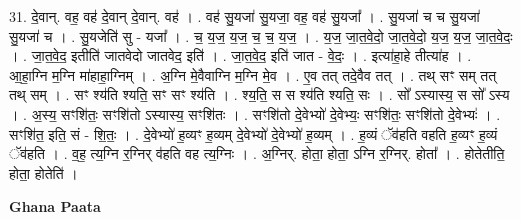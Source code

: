 \documentclass[17pt]{extarticle}
\begin{document}
31. दे॒वान्. वह॒ वह॑ दे॒वान् दे॒वान्. वह॑ । . वह॑ सु॒यजा॑ सु॒यजा॒ वह॒ वह॑ सु॒यजा᳚ । . सु॒यजा॑ च च सु॒यजा॑ सु॒यजा॑ च । . सु॒यजेति॑ सु - यजा᳚ । . च॒ य॒ज॒ य॒ज॒ च॒ च॒ य॒ज॒ । . य॒ज॒ जा॒त॒वे॒दो॒ जा॒त॒वे॒दो॒ य॒ज॒ य॒ज॒ जा॒त॒वे॒दः॒ । . जा॒त॒वे॒द॒ इतीति॑ जातवेदो जातवेद॒ इति॑ । . जा॒त॒वे॒द॒ इति॑ जात - वे॒दः॒ । . इत्या॑हा॒हे तीत्या॑ह । . आ॒हा॒ग्नि म॒ग्नि मा॑हाहा॒ग्निम् । . अ॒ग्नि मे॒वैवाग्नि म॒ग्नि मे॒व । . ए॒व तत् तदे॒वैव तत् । . तथ् सꣳ सम् तत् तथ् सम् । . सꣳ श्य॑ति श्यति॒ सꣳ सꣳ श्य॑ति । . श्य॒ति॒ स स श्य॑ति श्यति॒ सः । . सो᳚ ऽस्यास्य॒ स सो᳚ ऽस्य । . अ॒स्य॒ सꣳशि॑तः॒ सꣳशि॑तो ऽस्यास्य॒ सꣳशि॑तः । . सꣳशि॑तो दे॒वेभ्यो॑ दे॒वेभ्यः॒ सꣳशि॑तः॒ सꣳशि॑तो दे॒वेभ्यः॑ । . सꣳशि॑त॒ इति॒ सं - शि॒तः॒ । . दे॒वेभ्यो॑ ह॒व्यꣳ ह॒व्यम् दे॒वेभ्यो॑ दे॒वेभ्यो॑ ह॒व्यम् । . ह॒व्यं ॅव॑हति वहति ह॒व्यꣳ ह॒व्यं ॅव॑हति । . व॒ह॒ त्य॒ग्नि र॒ग्निर् व॑हति वह त्य॒ग्निः । . अ॒ग्निर्. होता॒ होता॒ ऽग्नि र॒ग्निर्. होता᳚ । . होतेतीति॒ होता॒ होतेति॑ । \newline

\textbf{Ghana Paata } \newline
\end{document}

